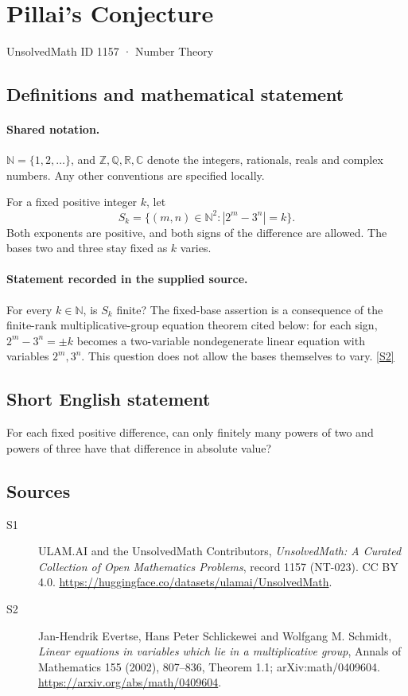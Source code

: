 \documentclass[11pt]{article}
\newcommand{\sref}[2]{\hyperlink{source:#1:#2}{[S#2]}}
\begin{document}
\setcounter{section}{1156}
\section{Pillai's Conjecture}\label{1157}
{\small\sffamily UnsolvedMath ID 1157 · Number Theory}
\subsection{Definitions and mathematical statement}

\paragraph{Shared notation.}$\mathbb N=\{1,2,\ldots\}$, and $\mathbb Z,\mathbb Q,\mathbb R,\mathbb C$ denote the integers, rationals, reals and complex numbers. Any other conventions are specified locally.


For a fixed positive integer \(k\), let
\[
 S_k=\{(m,n)\in\mathbb N^2:|2^m-3^n|=k\}.
\]
Both exponents are positive, and both signs of the difference are allowed.
The bases two and three stay fixed as \(k\) varies.
\paragraph{Statement recorded in the supplied source.}
For every \(k\in\mathbb N\), is \(S_k\) finite?
The fixed-base assertion is a consequence of the finite-rank
multiplicative-group equation theorem cited below: for each sign,
\(2^m-3^n=\pm k\) becomes a two-variable nondegenerate linear equation
with variables \(2^m,3^n\).  This question does not allow the bases
themselves to vary. \sref{1157}{2}
\subsection{Short English statement}
For each fixed positive difference, can only finitely many powers of two and powers of three have that difference in absolute value?
\subsection{Sources}
\begin{description}
\item[\hypertarget{source:1157:1}{S1}] ULAM.AI and the UnsolvedMath Contributors, \emph{UnsolvedMath: A Curated Collection of Open Mathematics Problems}, record 1157 (NT-023). CC BY 4.0. \url{https://huggingface.co/datasets/ulamai/UnsolvedMath}.
\item[\hypertarget{source:1157:2}{S2}] Jan-Hendrik Evertse, Hans Peter Schlickewei and Wolfgang M. Schmidt, \emph{Linear equations in variables which lie in a multiplicative group}, Annals of Mathematics 155 (2002), 807--836, Theorem 1.1; arXiv:math/0409604. \url{https://arxiv.org/abs/math/0409604}.
\end{description}
\label{end:1157}
\end{document}
